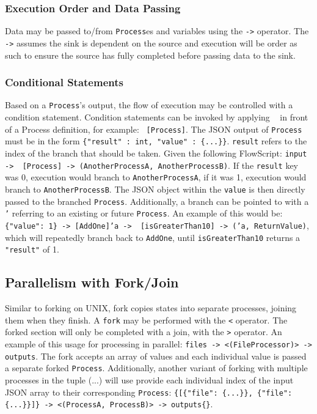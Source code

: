 \documentclass{article}
\begin{document}
			\subsubsection{Execution Order and Data Passing} Data may be passed to/from \texttt{Process}es and variables using the \texttt{->} operator. The \texttt{->} assumes the sink is dependent on the source and execution will be order as such to ensure the source has fully completed before passing data to the sink.
			\subsubsection{Conditional Statements} Based on a \texttt{Process}'s output, the flow of execution may be controlled with a condition statement. Condition statements can be invoked by applying \texttt{~} in front of a Process definition, for example: \texttt{~[Process]}. The JSON output of \texttt{Process} must be in the form \texttt{\{"result" : int, "value" : \{...\}\}}. \texttt{result} refers to the index of the branch that should be taken. Given the following FlowScript: \texttt{input{} -> ~[Process] -> (AnotherProcessA, AnotherProcessB)}. If the \texttt{result} key was 0, execution would branch to \texttt{AnotherProcessA}, if it was 1, execution would branch to \texttt{AnotherProcessB}. The JSON object within the \texttt{value} is then directly passed to the branched \texttt{Process}. Additionally, a branch can be pointed to with a \texttt{'} referring to an existing or future \texttt{Process}. An example of this would be: \texttt{\{"value": 1\} -> [AddOne]'a -> ~[isGreaterThan10] -> ('a, ReturnValue)}, which will repeatedly branch back to \texttt{AddOne}, until \texttt{isGreaterThan10} returns a \texttt{"result"} of 1.
			\subsection{Parallelism with Fork/Join} Similar to forking on UNIX, fork copies states into separate processes, joining them when they finish. A \texttt{fork} may be performed with the \texttt{<} operator. The forked section will only be completed with a join, with the \texttt{>} operator. An example of this usage for processing in parallel: \texttt{files{} -> <(FileProcessor)> -> outputs}. The fork accepts an array of values and each individual value is passed a separate forked \texttt{Process}. Additionally, another variant of forking with multiple processes in the tuple (...) will use provide each individual index of the input JSON array to their corresponding \texttt{Process}: \texttt{\{[\{"file": \{...\}\}, \{"file": \{...\}\}]\} -> <(ProcessA, ProcessB)> -> outputs\{\}}.
\end{document}
